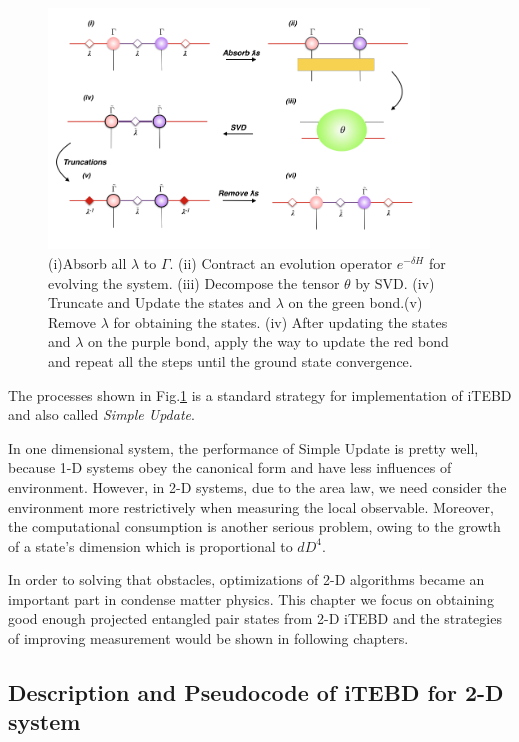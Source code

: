 \label{1ditebd}
\begin{figure}[ht]
	\centering
	\includegraphics[width=0.90\textwidth]{figures/fig313.png}
	\caption[The tensor network diagrams for the 1-D iTEBD]{ (i)Absorb all $\lambda$ to $\Gamma$. (ii) Contract an evolution operator $e^{-\delta H}$ for evolving the system. (iii) Decompose the tensor $\theta$ by SVD. (iv) Truncate and Update the states and $\lambda$ on the green bond.(v) Remove $
		\lambda$ for obtaining the states. (iv) After updating the states and $\lambda$ on the purple bond, apply the way to update the red bond and repeat all the steps until the ground state convergence.}
	\label{fig313}
\end{figure}

The processes shown in Fig.\ref{fig313} is a standard strategy for implementation of iTEBD and also called \textit{Simple Update}. 

In one dimensional system, the performance of Simple Update is pretty well, because 1-D systems obey the canonical form and have less influences of environment. However, in 2-D systems, due to the area law, we need consider the environment more restrictively when measuring the local observable. Moreover, the computational consumption is another serious problem, owing to the growth of a state's dimension which is proportional to $dD^4$.

In order to solving that obstacles, optimizations of 2-D algorithms  became an important part in condense matter physics. This chapter we focus on obtaining good enough projected entangled pair states from 2-D iTEBD and the strategies of improving measurement would be shown in following chapters.

\subsection{Description and Pseudocode of iTEBD for 2-D system}
\label{2ditebd}


